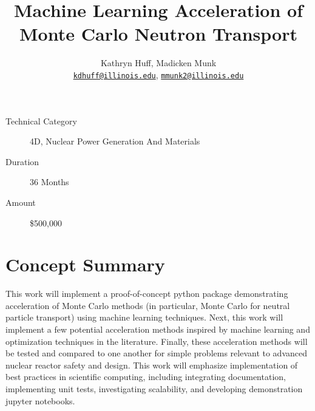 \documentclass[letterpaper,12pt]{article}
\author{Kathryn Huff, Madicken Munk\\
        \href{mailto:kdhuff@illinois.edu}{\texttt{kdhuff@illinois.edu}},
        \href{mailto:mmunk2@illinois.edu}{\texttt{mmunk2@illinois.edu}}
}
\date{}
\title{Machine Learning Acceleration of Monte Carlo Neutron Transport}
\begin{document}
\maketitle

\thispagestyle{fancy}

\begin{description}
    \item[Technical Category] 4D, Nuclear Power Generation And Materials
    \item[Duration] 36 Months
    \item[Amount] \$500,000
\end{description}

\section{Concept Summary}


This work will implement a proof-of-concept python package demonstrating
acceleration of Monte Carlo methods (in particular, Monte Carlo for neutral
particle transport) using machine learning techniques.
Next, this work will implement a few potential acceleration methods inspired by machine
learning and optimization techniques in the literature.
Finally, these acceleration methods will be tested and compared to one another for simple
problems relevant to advanced nuclear reactor safety and design. 
This work will emphasize implementation of best practices in
scientific computing, including integrating documentation, implementing unit
tests, investigating scalability, and developing demonstration jupyter
notebooks.
\end{document}

